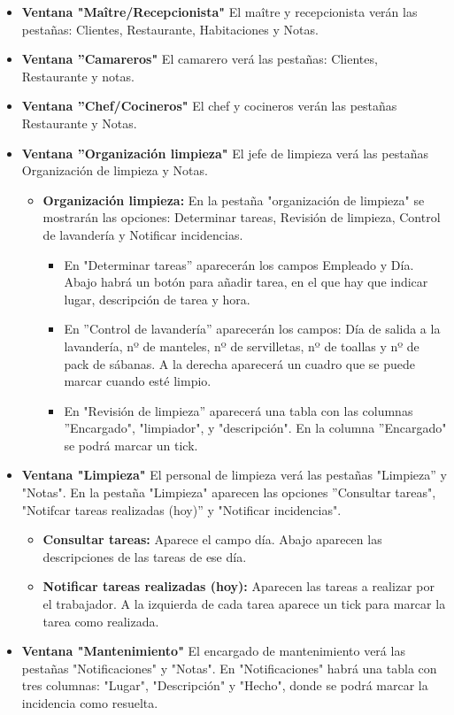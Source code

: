 \documentclass[spanish,a4paper,12pt]{report}	%
\begin{document}
\begin{itemize}
				 \item \textbf{Ventana "Maître/Recepcionista" } El maître y recepcionista verán las pestañas: Clientes, Restaurante, Habitaciones y Notas. 
				 \item \textbf{Ventana ''Camareros" }El camarero verá las pestañas: Clientes, Restaurante y notas. 	
				 \item \textbf{Ventana ''Chef/Cocineros" }El chef y cocineros verán las pestañas Restaurante y Notas. 
				 \item \textbf{Ventana ''Organización limpieza" }El jefe de limpieza verá las pestañas Organización de limpieza y Notas. 
					\begin{itemize}
						 \item \textbf{Organización limpieza: }En la pestaña "organización de limpieza" se mostrarán las opciones: Determinar tareas, Revisión de limpieza, Control de lavandería y Notificar incidencias. 
						 \begin{itemize}
							\item En "Determinar tareas'' aparecerán los campos Empleado y Día. Abajo habrá un botón para añadir tarea, en el que hay que indicar lugar, descripción de tarea y hora.
							\item En ''Control de lavandería'' aparecerán los campos: Día de salida a la lavandería, nº de manteles, nº de servilletas, nº de toallas y nº de pack de sábanas. A la derecha aparecerá un cuadro que se puede marcar cuando esté limpio. 
							\item En "Revisión de limpieza'' aparecerá una tabla con las columnas ''Encargado", "limpiador", y "descripción". En la columna ''Encargado" se podrá marcar un tick. 	
						\end{itemize}
					\end{itemize}
				 \item \textbf{Ventana "Limpieza" }El personal de limpieza verá las pestañas "Limpieza'' y "Notas". En la pestaña "Limpieza" aparecen las opciones ''Consultar tareas", "Notifcar tareas realizadas (hoy)'' y "Notificar incidencias".
					\begin{itemize}
						\item \textbf{Consultar tareas: }Aparece el campo día. Abajo aparecen las descripciones de las tareas de ese día. 
						 \item \textbf{Notificar tareas realizadas (hoy): }Aparecen las tareas a realizar por el trabajador. A la izquierda de cada tarea aparece un tick para marcar la tarea como realizada. 
					\end{itemize}
				 \item \textbf{Ventana "Mantenimiento" } El encargado de mantenimiento verá las pestañas "Notificaciones" y "Notas". En "Notificaciones" habrá una tabla con tres columnas: "Lugar", "Descripción" y "Hecho", donde se podrá marcar la incidencia como resuelta. 
			\end{itemize}
\end{document}
